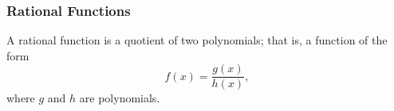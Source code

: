 \begin{frame}
\frametitle{Rational Functions}
\begin{definition}
A rational function is a quotient of two polynomials; that is, a function of the form
\[
f(x) = \frac{g(x)}{h(x)},
\]
where $g$ and $h$ are polynomials.
\end{definition}
\begin{columns}[c]
\end{columns}
\end{frame}
